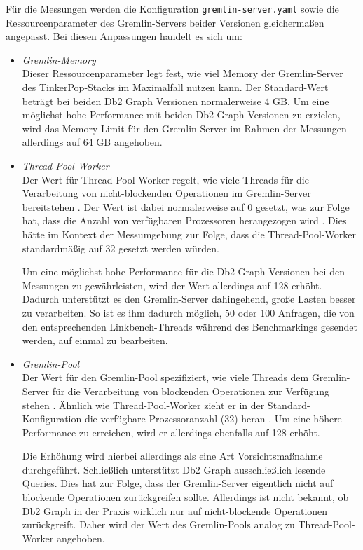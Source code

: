 Für die Messungen werden die Konfiguration \texttt{gremlin-server.yaml} sowie die Ressourcenparameter des Gremlin-Servers beider Versionen gleichermaßen angepasst. Bei diesen Anpassungen handelt es sich um:
\begin{itemize}
    \item \textit{Gremlin-Memory}\\
    Dieser Ressourcenparameter legt fest, wie viel Memory der Gremlin-Server des TinkerPop-Stacks im Maximalfall nutzen kann. Der Standard-Wert beträgt bei beiden Db2 Graph Versionen normalerweise 4 GB. Um eine möglichst hohe Performance mit beiden Db2 Graph Versionen zu erzielen, wird das Memory-Limit für den Gremlin-Server im Rahmen der Messungen allerdings auf 64 GB angehoben. 
    \item \textit{Thread-Pool-Worker}\\
    Der Wert für Thread-Pool-Worker regelt, wie viele Threads für die Verarbeitung von nicht-blockenden Operationen im Gremlin-Server bereitstehen \cite{tinkerpop_2020}. Der Wert ist dabei normalerweise auf 0 gesetzt, was zur Folge hat, dass die Anzahl von verfügbaren Prozessoren herangezogen wird \cite{tinkerpop_2020}. Dies hätte im Kontext der Messumgebung zur Folge, dass die Thread-Pool-Worker standardmäßig auf 32 gesetzt werden würden. 
    
    Um eine möglichst hohe Performance für die Db2 Graph Versionen bei den Messungen zu gewährleisten, wird der Wert allerdings auf 128 erhöht. Dadurch unterstützt es den Gremlin-Server dahingehend, große Lasten besser zu verarbeiten. So ist es ihm dadurch möglich, 50 oder 100 Anfragen, die von den entsprechenden Linkbench-Threads während des Benchmarkings gesendet werden, auf einmal zu bearbeiten. 
    \item \textit{Gremlin-Pool}\\
    Der Wert für den Gremlin-Pool spezifiziert, wie viele Threads dem Gremlin-Server für die Verarbeitung von blockenden Operationen zur Verfügung stehen \cite{tinkerpop_2020}. Ähnlich wie Thread-Pool-Worker zieht er in der Standard-Konfiguration die verfügbare Prozessoranzahl (32) heran \cite{tinkerpop_2020}. Um eine höhere Performance zu erreichen, wird er allerdings ebenfalls auf 128 erhöht. 
    
    Die Erhöhung wird hierbei allerdings als eine Art Vorsichtsmaßnahme durchgeführt. Schließlich unterstützt Db2 Graph ausschließlich lesende Queries. Dies hat zur Folge, dass der Gremlin-Server eigentlich nicht auf blockende Operationen zurückgreifen sollte. Allerdings ist nicht bekannt, ob Db2 Graph in der Praxis wirklich nur auf nicht-blockende Operationen zurückgreift. Daher wird der Wert des Gremlin-Pools analog zu Thread-Pool-Worker angehoben. 
\end{itemize}

